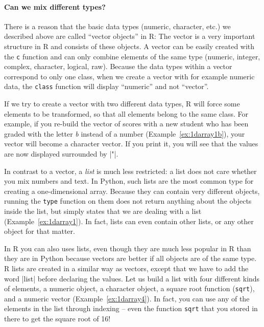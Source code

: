\paragraph[Can we mix different types?]{Can we mix different types?}
There is a reason that the basic data types (numeric, character, etc.) we described above are called
``vector objects'' in R: The vector is a very important structure in
R and consists of these objects. A vector can be easily created with the
\texttt{c} function and can only combine elements of the same type (numeric, integer, complex,
character, logical, raw).
Because the data types within a vector correspond to only one class,
when we create a vector with for example numeric data, the \texttt{class} function will display
``numeric'' and not ``vector''.

If we try to
create a vector with two different data types, R will 
force some elements to be transformed, so that all elements belong to the same
class. For example, if you re-build the vector of scores with a new student who has
been graded with the letter \emph{b} instead of a number (Example~\ref{ex:1darray1b}), your vector
will become a character vector. If you print it, you will see that the
values are now displayed surrounded by |"|.




In contrast to a vector, a \emph{list} is much less restricted: a list does not care
whether you mix numbers and text. In Python, such lists are the most common type for creating
a one-dimensional array. Because they
can contain very different objects, running the \texttt{type} function on them
does not return anything about the objects inside the list, but simply states that we
are dealing with a list (Example~\ref{ex:1darray1}).
In fact, lists can even contain other lists, or any other object for
that matter.

In R you can also uses lists, even though they are much less popular in R than
they are in Python because vectors are better if all objects are of the same type.
R lists are created in a similar way as vectors, except that we have to add the word |list|
before declaring the values. Let us build a list with four different
kinds of elements, a numeric object, a character object, a square root
function (\texttt{sqrt}), and a numeric vector (Example~\ref{ex:1darray4}). In fact, you
can use any of the elements in the list through indexing -- even the
function \texttt{sqrt} that you stored in there to get the square root of
16!

